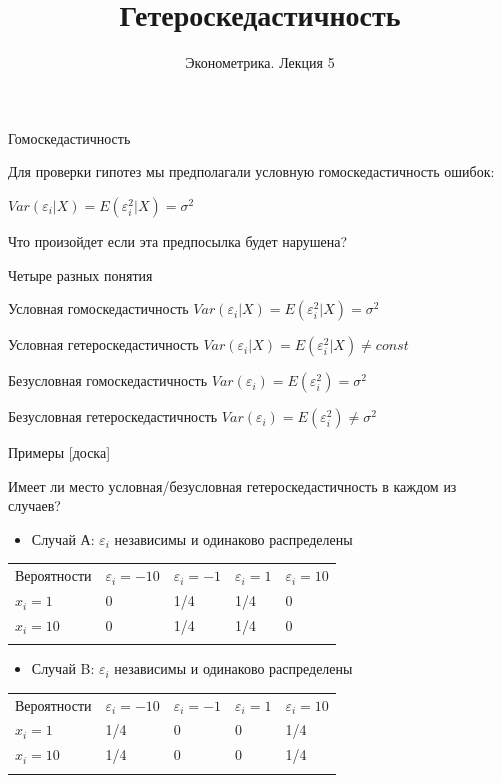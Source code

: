 \documentclass[ignorenonframetext,]{beamer}
\author[Эконометрика. Лекция 5]{Эконометрика. Лекция 5}
\title{Гетероскедастичность}
\newcommand{\e}{\varepsilon}
\begin{document}
\frame{\titlepage}

\begin{frame}{Гомоскедастичность}

Для проверки гипотез мы предполагали условную гомоскедастичность ошибок:

$Var(\varepsilon_i | X)=E(\varepsilon_i^2 | X)=\sigma^2$

Что произойдет если эта предпосылка будет нарушена?

\end{frame}

\begin{frame}{Четыре разных понятия}

Условная гомоскедастичность
$Var(\varepsilon_i | X)=E(\varepsilon_i^2 | X)=\sigma^2$

Условная гетероскедастичность
$Var(\varepsilon_i | X)=E(\varepsilon_i^2 | X) \neq const$

Безусловная гомоскедастичность
$Var(\varepsilon_i)=E(\varepsilon_i^2)=\sigma^2$

Безусловная гетероскедастичность
$Var(\varepsilon_i)=E(\varepsilon_i^2) \neq \sigma^2$

\end{frame}

\begin{frame}{Примеры {[}доска{]}}

Имеет ли место условная/безусловная гетероскедастичность в каждом из
случаев?

\begin{itemize}
\itemsep1pt\parskip0pt
\item
  Случай А: $\e_i$ независимы и одинаково распределены
\end{itemize}

\begin{longtable}[c]{@{}lllll@{}}
\toprule\addlinespace
Вероятности & $\e_i=-10$ & $\e_i=-1$ & $\e_i=1$ & $\e_i=10$
\\\addlinespace
\midrule\endhead
$x_i=1$ & 0 & 1/4 & 1/4 & 0
\\\addlinespace
$x_i=10$ & 0 & 1/4 & 1/4 & 0
\\\addlinespace
\bottomrule
\end{longtable}

\begin{itemize}
\itemsep1pt\parskip0pt
\item
  Случай B: $\e_i$ независимы и одинаково распределены
\end{itemize}

\begin{longtable}[c]{@{}lllll@{}}
\toprule\addlinespace
Вероятности & $\e_i=-10$ & $\e_i=-1$ & $\e_i=1$ & $\e_i=10$
\\\addlinespace
\midrule\endhead
$x_i=1$ & 1/4 & 0 & 0 & 1/4
\\\addlinespace
$x_i=10$ & 1/4 & 0 & 0 & 1/4
\\\addlinespace
\bottomrule
\end{longtable}

\end{frame}
\end{document}
